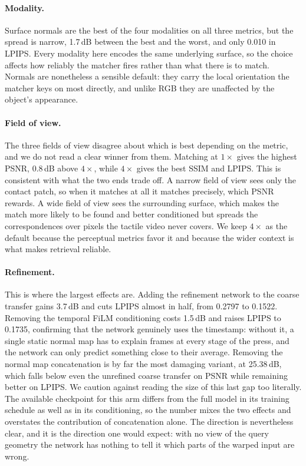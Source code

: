 

\paragraph{Modality.}
Surface normals are the best of the four modalities on all three metrics, but the spread is
narrow, 1.7\,dB between the best and the worst, and only 0.010 in LPIPS. Every modality here
encodes the same underlying surface, so the choice affects how reliably the matcher fires rather
than what there is to match. Normals are nonetheless a sensible default: they carry the local
orientation the matcher keys on most directly, and unlike RGB they are unaffected by the object's
appearance.

\paragraph{Field of view.}
The three fields of view disagree about which is best depending on the metric, and we do not read
a clear winner from them. Matching at $1\times$ gives the highest PSNR, 0.8\,dB above $4\times$,
while $4\times$ gives the best SSIM and LPIPS. This is consistent with what the two ends trade
off. A narrow field of view sees only the contact patch, so when it matches at all it matches
precisely, which PSNR rewards. A wide field of view sees the surrounding surface, which makes the
match more likely to be found and better conditioned but spreads the correspondences over pixels
the tactile video never covers. We keep $4\times$ as the default because the perceptual metrics
favor it and because the wider context is what makes retrieval reliable.

\paragraph{Refinement.}
This is where the largest effects are. Adding the refinement network to the coarse transfer gains
3.7\,dB and cuts LPIPS almost in half, from 0.2797 to 0.1522. Removing the temporal FiLM
conditioning costs 1.5\,dB and raises LPIPS to 0.1735, confirming that the network genuinely uses
the timestamp: without it, a single static normal map has to explain frames at every stage of the
press, and the network can only predict something close to their average. Removing the normal map
concatenation is by far the most damaging variant, at 25.38\,dB, which falls below even the
unrefined coarse transfer on PSNR while remaining better on LPIPS. We caution against reading the
size of this last gap too literally. The available checkpoint for this arm differs from the full
model in its training schedule as well as in its conditioning, so the number mixes the two effects
and overstates the contribution of concatenation alone. The direction is nevertheless clear, and
it is the direction one would expect: with no view of the query geometry the network has nothing
to tell it which parts of the warped input are wrong.


